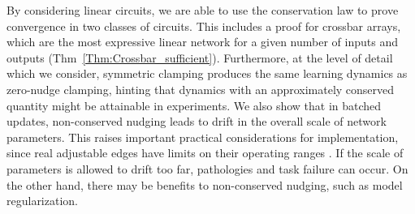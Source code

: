 \documentclass[final, 11pt, nonatbib]{elsarticle}
\theoremstyle{definition}
\theoremstyle{plain}
\numberwithin{equation}{section}
\begin{document}
By considering linear circuits, we are able to use the conservation law to prove convergence in two classes of circuits. This includes a proof for crossbar arrays, which are the most expressive linear network for a given number of inputs and outputs (Thm~\ref{Thm:Crossbar_sufficient}). Furthermore, at the level of detail which we consider, symmetric clamping produces the same learning dynamics as zero-nudge clamping, hinting that dynamics with an approximately conserved quantity might be attainable in experiments. We also show that in batched updates, non-conserved nudging leads to drift in the overall scale of network parameters. This raises important practical considerations for implementation, since real adjustable edges have limits on their operating ranges \cite{dillavouMachineLearningProcessor2024}. If the scale of parameters is allowed to drift too far, pathologies and task failure can occur. On the other hand, there may be benefits to non-conserved nudging, such as model regularization.












\end{document}
